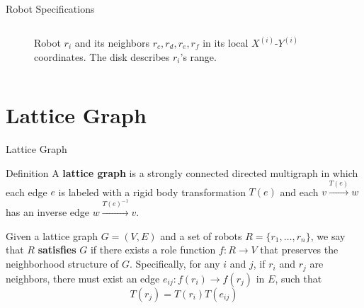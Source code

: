 \documentclass[10pt]{beamer}
\newcommand{\edge}[3]{{#1}\overset{#2}{\longrightarrow}{#3}}
\begin{document}
\begin{frame}{Robot Specifications}{}
\begin{block}{}
\begin{columns}[T]
\begin{column}{.4\textwidth}
\begin{figure}
          \caption{Robot $r_i$ and its neighbors $r_c, r_d, r_e,
            r_f$ in its local $X^{(i)}$-$Y^{(i)}$ coordinates. The
            disk describes $r_i$'s range.}
          \label{fig:robotmodel}
        \end{figure}
      \end{column}%
    \end{columns}
\end{block}
\end{frame}

\section{Lattice Graph}
\begin{frame}{Lattice Graph}
    \begin{bclogo}[couleur=orange!10, arrondi=0.2, ombre=true]{Definition}
      A \textbf{lattice graph} is a strongly connected directed
      multigraph in which each edge $e$ is labeled with a rigid body
      transformation $T(e)$ and each $\edge{v}{T(e)}{w}$ has an
      inverse edge $\edge{w}{T(e)^{-1}}{v}$.  
    \end{bclogo}
    \begin{block}{}
      Given a lattice graph $G=(V, E)$ and a set of robots $R = \{
      r_1, \ldots, r_n \}$, we say that $R$ \textbf{satisfies} $G$ if
      there exists a role function $f: R \rightarrow V$ that preserves
      the neighborhood structure of $G$.
      Specifically, for any $i$ and $j$, if $r_i$ and $r_j$ are neighbors, 
      there must exist an edge
      $e_{ij}: \edge{f(r_i)}{}{f(r_j)}$ in $E$, such that
      $$ T(r_j) = T(r_i) T(e_{ij})$$
  \end{block}
\end{frame}
\end{document}
